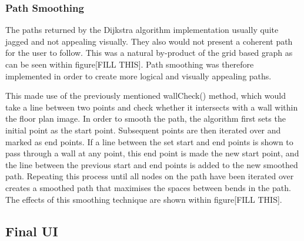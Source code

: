 \documentclass[main.tex]{subfiles}
\begin{document}
\subsubsection{Path Smoothing}

The paths returned by the Dijkstra algorithm implementation usually quite jagged and not appealing visually. They also would not present a coherent path for the user to follow. This was a natural by-product of the grid based graph as can be seen within figure[FILL THIS]. Path smoothing was therefore implemented in order to create more logical and visually appealing paths.

This made use of the previously mentioned wallCheck() method, which would take a line between two points and check whether it intersects with a wall within the floor plan image. In order to smooth the path, the algorithm first sets the initial point as the start point. Subsequent points are then iterated over and marked as end points. If a line between the set start and end points is shown to pass through a wall at any point, this end point is made the new start point, and the line between the previous start and end points is added to the new smoothed path. Repeating this process until all nodes on the path have been iterated over creates a smoothed path that maximises the spaces between bends in the path. The effects of this smoothing technique are shown within figure[FILL THIS].

\subsection{Final UI}
\end{document}
